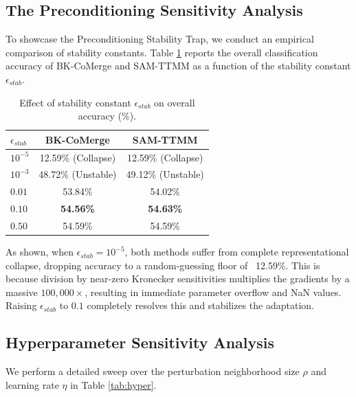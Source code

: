 \documentclass{article}
\theoremstyle{plain}
\theoremstyle{definition}
\theoremstyle{remark}
\begin{document}
\subsection{The Preconditioning Sensitivity Analysis}
To showcase the Preconditioning Stability Trap, we conduct an empirical comparison of stability constants. Table \ref{tab:stability} reports the overall classification accuracy of BK-CoMerge and SAM-TTMM as a function of the stability constant $\epsilon_{stab}$.
\begin{table}[h]
\caption{Effect of stability constant $\epsilon_{stab}$ on overall accuracy (\%).}
\label{tab:stability}
\vskip 0.15in
\begin{center}
\begin{small}
\begin{sc}
\begin{tabular}{lcc}
\toprule
$\epsilon_{stab}$ & BK-CoMerge & SAM-TTMM \\
\midrule
$10^{-5}$ & 12.59\% (Collapse) & 12.59\% (Collapse) \\
$10^{-3}$ & 48.72\% (Unstable) & 49.12\% (Unstable) \\
$0.01$ & 53.84\% & 54.02\% \\
$0.10$ & \textbf{54.56\%} & \textbf{54.63\%} \\
$0.50$ & 54.59\% & 54.59\% \\
\bottomrule
\end{tabular}
\end{sc}
\end{small}
\end{center}
\vskip -0.1in
\end{table}

As shown, when $\epsilon_{stab} = 10^{-5}$, both methods suffer from complete representational collapse, dropping accuracy to a random-guessing floor of ~12.59\%. This is because division by near-zero Kronecker sensitivities multiplies the gradients by a massive $100,000\times$, resulting in immediate parameter overflow and NaN values. Raising $\epsilon_{stab}$ to $0.1$ completely resolves this and stabilizes the adaptation.

\subsection{Hyperparameter Sensitivity Analysis}
We perform a detailed sweep over the perturbation neighborhood size $\rho$ and learning rate $\eta$ in Table \ref{tab:hyper}.
\end{document}
